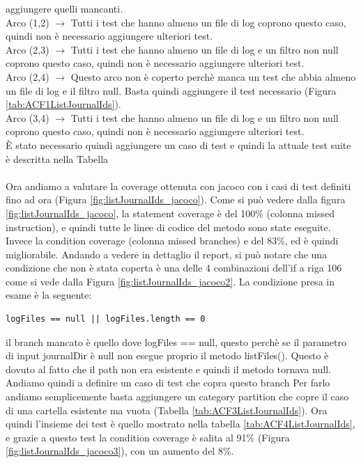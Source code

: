 \documentclass[10pt, a4paper]{article}
\begin{document}
aggiungere quelli mancanti. \\
Arco (1,2)  $\rightarrow$  Tutti i test che hanno almeno un file di log coprono questo caso, quindi non è necessario aggiungere ulteriori test. \\
Arco (2,3)  $\rightarrow$ Tutti i test che hanno almeno un file di log e un filtro non null coprono questo caso, quindi non è necessario aggiungere ulteriori test. \\
Arco (2,4)  $\rightarrow$ Questo arco non è coperto perchè manca un test che abbia almeno un file di log e il filtro null. Basta quindi aggiungere il 
test necessario (Figura \ref{tab:ACF1ListJournalIds}). \\
Arco (3,4)  $\rightarrow$ Tutti i test che hanno almeno un file di log e un filtro non null coprono questo caso, quindi non è necessario aggiungere ulteriori test. \\ 
È stato necessario quindi aggiungere un caso di test e quindi la attuale test suite è descritta nella Tabella  \\ \\
Ora andiamo a valutare la coverage ottenuta con jacoco con i casi di test definiti fino ad ora (Figura \ref{fig:listJournalIds_jacoco}). 
Come si può vedere dalla figura \ref{fig:listJournalIds_jacoco},
la statement coverage è del 100\% (colonna missed instruction), 
e quindi tutte le linee di codice del metodo sono state eseguite. \\
Invece la condition coverage (colonna missed branches) e del 83\%, ed è quindi migliorabile.
Andando a vedere in dettaglio il report, si può notare che una condizione che non è stata coperta
è una delle 4 combinazioni dell'if a riga 106 come si vede dalla Figura \ref{fig:listJournalIds_jacoco2}.
La condizione presa in esame è la seguente:
\begin{verbatim}
logFiles == null || logFiles.length == 0
\end{verbatim}
il branch mancato è quello dove logFiles == null, questo perchè se il parametro di input journalDir è null non esegue proprio il metodo listFiles().
Questo è dovuto al fatto che il path non era esistente e quindi il metodo tornava null.
Andiamo quindi a definire un caso di test che copra questo branch
Per farlo andiamo semplicemente basta aggiungere un category partition che copre il caso di una cartella esistente ma vuota
(Tabella \ref{tab:ACF3ListJournalIds}). Ora quindi l'insieme dei test è quello mostrato nella tabella \ref{tab:ACF4ListJournalIds}, 
e grazie a questo test la condition coverage è salita al 91\% (Figura \ref{fig:listJournalIds_jacoco3}),
con un aumento del 8\%.
\end{document}
